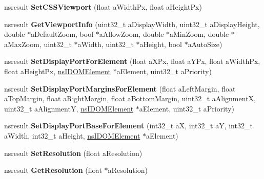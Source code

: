 \begin{DoxyCompactItemize}
nsresult {\bfseries Set\+C\+S\+S\+Viewport} (float a\+Width\+Px, float a\+Height\+Px)
\item 
\mbox{\label{interfacens_i_d_o_m_window_utils_a738b4a7eac6b830f44469fcc05af66be}} 
nsresult {\bfseries Get\+Viewport\+Info} (uint32\+\_\+t a\+Display\+Width, uint32\+\_\+t a\+Display\+Height, double $\ast$a\+Default\+Zoom, bool $\ast$a\+Allow\+Zoom, double $\ast$a\+Min\+Zoom, double $\ast$a\+Max\+Zoom, uint32\+\_\+t $\ast$a\+Width, uint32\+\_\+t $\ast$a\+Height, bool $\ast$a\+Auto\+Size)
\item 
\mbox{\label{interfacens_i_d_o_m_window_utils_ad23de268940ebf04e152569b64cabe96}} 
nsresult {\bfseries Set\+Display\+Port\+For\+Element} (float a\+X\+Px, float a\+Y\+Px, float a\+Width\+Px, float a\+Height\+Px, \hyperlink{interfacens_i_d_o_m_element}{ns\+I\+D\+O\+M\+Element} $\ast$a\+Element, uint32\+\_\+t a\+Priority)
\item 
\mbox{\label{interfacens_i_d_o_m_window_utils_ac3ae55c275393fd6369480c9f42cfca9}} 
nsresult {\bfseries Set\+Display\+Port\+Margins\+For\+Element} (float a\+Left\+Margin, float a\+Top\+Margin, float a\+Right\+Margin, float a\+Bottom\+Margin, uint32\+\_\+t a\+AlignmentX, uint32\+\_\+t a\+AlignmentY, \hyperlink{interfacens_i_d_o_m_element}{ns\+I\+D\+O\+M\+Element} $\ast$a\+Element, uint32\+\_\+t a\+Priority)
\item 
\mbox{\label{interfacens_i_d_o_m_window_utils_ad4e4a83a5a285985a2e9cd09c3085b78}} 
nsresult {\bfseries Set\+Display\+Port\+Base\+For\+Element} (int32\+\_\+t aX, int32\+\_\+t aY, int32\+\_\+t a\+Width, int32\+\_\+t a\+Height, \hyperlink{interfacens_i_d_o_m_element}{ns\+I\+D\+O\+M\+Element} $\ast$a\+Element)
\item 
\mbox{\label{interfacens_i_d_o_m_window_utils_ae16018a66149525a0a9155fcc1cd2342}} 
nsresult {\bfseries Set\+Resolution} (float a\+Resolution)
\item 
\mbox{\label{interfacens_i_d_o_m_window_utils_ab15028d4ff7187e9250020681f672f1f}} 
nsresult {\bfseries Get\+Resolution} (float $\ast$a\+Resolution)
\item 

\end{DoxyCompactItemize}
